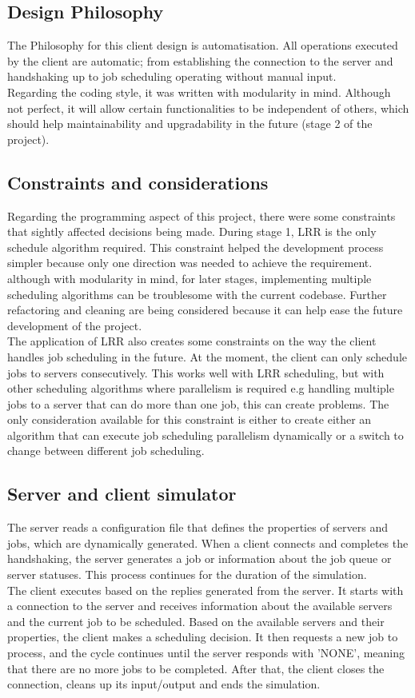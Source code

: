 \documentclass[a4paper]{article} %
\begin{document}
\subsection{Design Philosophy}
The Philosophy for this client design is automatisation. All operations executed by the client are automatic; from establishing the connection to the server and handshaking up to job scheduling operating without manual input.
\\Regarding the coding style, it was written with modularity in mind. Although not perfect, it will allow certain functionalities to be independent of others, which should help maintainability and upgradability in the future (stage 2 of the project).

\subsection{Constraints and considerations}
Regarding the programming aspect of this project, there were some constraints that sightly affected decisions being made. During stage 1, LRR is the only schedule algorithm required. This constraint helped the development process simpler because only one direction was needed to achieve the requirement. although with modularity in mind, for later stages, implementing multiple scheduling algorithms can be troublesome with the current codebase. Further refactoring and cleaning are being considered because it can help ease the future development of the project. 
\\The application of LRR also creates some constraints on the way the client handles job scheduling in the future. At the moment, the client can only schedule jobs to servers consecutively. This works well with LRR scheduling, but with other scheduling algorithms where parallelism is required e.g handling multiple jobs to a server that can do more than one job, this can create problems. The only consideration available for this constraint is either to create either an algorithm that can execute job scheduling parallelism dynamically or a switch to change between different job scheduling.
\subsection{Server and client simulator}
The server reads a configuration file that defines the properties of servers and jobs, which are dynamically generated. When a client connects and completes the handshaking, the server generates a job or information about the job queue or server statuses. This process continues for the duration of the simulation.
\\The client executes based on the replies generated from the server. It starts with a connection to the server and receives information about the available servers and the current job to be scheduled. Based on the available servers and their properties, the client makes a scheduling decision. It then requests a new job to process, and the cycle continues until the server responds with 'NONE', meaning that there are no more jobs to be completed. After that, the client closes the connection, cleans up its input/output and ends the simulation. 
\end{document}
